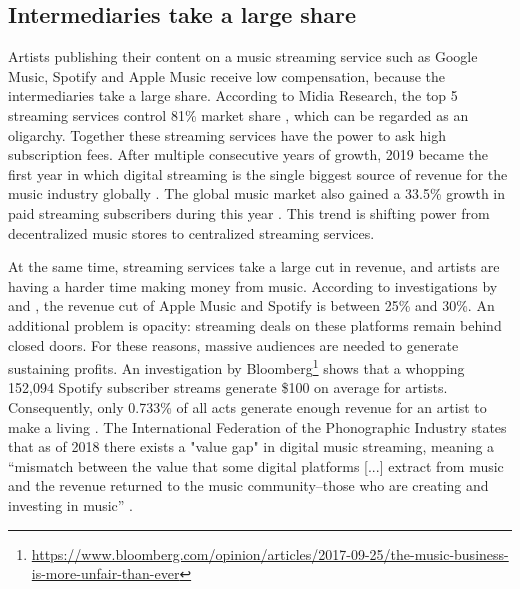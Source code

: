 \subsection{Intermediaries take a large share}
Artists publishing their content on a music streaming service such as Google Music, Spotify and Apple Music receive low compensation, because the intermediaries take a large share. According to Midia Research, the top 5 streaming services control 81\% market share \citep{midiamarketshare2020}, which can be regarded as an oligarchy. Together these streaming services have the power to ask high subscription fees. After multiple consecutive years of growth, 2019 became the first year in which digital streaming is the single biggest source of revenue for the music industry globally \citep{ifpi2020global}. The global music market also gained a 33.5\% growth in paid streaming subscribers during this year \citep{ifpi2020global}. This trend is shifting power from decentralized music stores to centralized streaming services. 

At the same time, streaming services take a large cut in revenue, and artists are having a harder time making money from music. According to investigations by \cite{chris2018dissecting} and \cite{recode2015}, the revenue cut of Apple Music and Spotify is between 25\% and 30\%. An additional problem is opacity: streaming deals on these platforms remain behind closed doors. For these reasons, massive audiences are needed to generate sustaining profits. An investigation by Bloomberg\footnote{\url{https://www.bloomberg.com/opinion/articles/2017-09-25/the-music-business-is-more-unfair-than-ever}} shows that a whopping 152,094 Spotify subscriber streams generate \$100 on average for artists. Consequently, only 0.733\% of all acts generate enough revenue for an artist to make a living \citep{ingham2018odds}. The International Federation of the Phonographic Industry states that as of 2018 there exists a "value gap" in digital music streaming, meaning a ``mismatch between the value that some digital platforms [...] extract from music and the revenue returned to the music community–those who are creating and investing in music'' \citep{ifpi2018global}.

